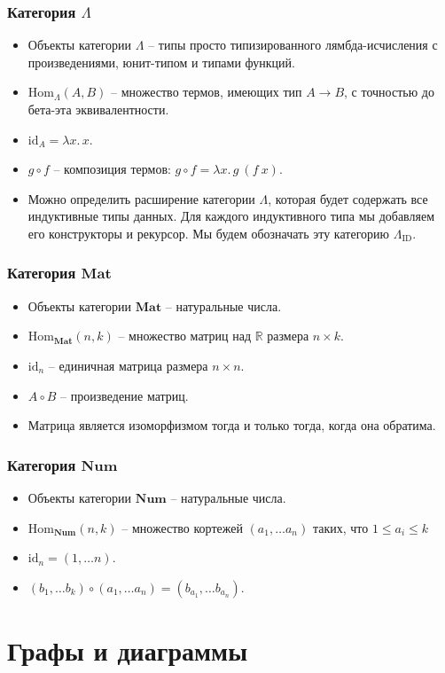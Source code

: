 \documentclass{beamer}
\newcommand{\cat}[1]{\mathbf{#1}}
\newcommand{\Mat}{\cat{Mat}}
\newcommand{\Num}{\cat{Num}}
\newcommand{\fs}[1]{\mathrm{#1}}
\newcommand{\Hom}{\fs{Hom}}
\newcommand{\id}{\fs{id}}
\begin{document}
\begin{frame}
\frametitle{Категория $\Lambda$}
\begin{itemize}
\item Объекты категории $\Lambda$ -- типы просто типизированного лямбда-исчисления с произведениями, юнит-типом и типами функций.
\item $\Hom_\Lambda(A, B)$ -- множество термов, имеющих тип $A \to B$, с точностью до бета-эта эквивалентности.
\item $\id_A = \lambda x.\,x$.
\item $g \circ f$ -- композиция термов: $g \circ f = \lambda x.\,g\ (f\ x)$.
\item Можно определить расширение категории $\Lambda$, которая будет содержать все индуктивные типы данных.
Для каждого индуктивного типа мы добавляем его конструкторы и рекурсор.
Мы будем обозначать эту категорию $\Lambda_\fs{ID}$.
\end{itemize}
\end{frame}

\begin{frame}
\frametitle{Категория $\Mat$}
\begin{itemize}
\item Объекты категории $\Mat$ -- натуральные числа.
\item $\Hom_\Mat(n, k)$ -- множество матриц над $\mathbb{R}$ размера $n \times k$.
\item $\id_n$ -- единичная матрица размера $n \times n$.
\item $A \circ B$ -- произведение матриц.
\item Матрица является изоморфизмом тогда и только тогда, когда она обратима.
\end{itemize}
\end{frame}

\begin{frame}
\frametitle{Категория $\Num$}
\begin{itemize}
\item Объекты категории $\Num$ -- натуральные числа.
\item $\Hom_\Num(n, k)$ -- множество кортежей $(a_1, \ldots a_n)$ таких, что $1 \leq a_i \leq k$
\item $\id_n = (1, \ldots n)$.
\item $(b_1, \ldots b_k) \circ (a_1, \ldots a_n) = (b_{a_1}, \ldots b_{a_n})$.
\end{itemize}
\end{frame}

\section{Графы и диаграммы}
\end{document}
